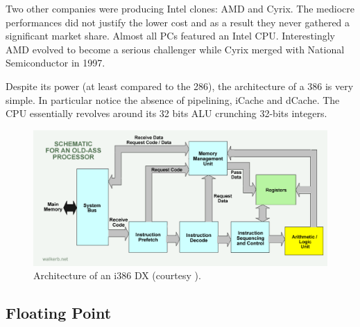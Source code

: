\documentclass[book.tex]{subfiles}
\begin{document}
 \bigskip
 


\par

 Two other companies were producing Intel clones: AMD and Cyrix. The mediocre performances did not justify the lower cost and as a result they never gathered a significant market share. Almost all PCs featured an Intel CPU. Interestingly AMD evolved to become a serious challenger while Cyrix merged with National Semiconductor in 1997.\\
\par
Despite its power (at least compared to the 286), the architecture of a 386 is very simple. In particular notice the absence of pipelining, iCache and dCache. The CPU essentially revolves around its 32 bits ALU crunching 32-bits integers.

\begin{figure}[H]
\centering
  
      \includegraphics[width=\textwidth]{imgs/drawings/80386DX_arch.png}
\caption{Architecture of an i386 DX (courtesy ).}
\end{figure}








  \subsection{Floating Point}
  
\end{document}
